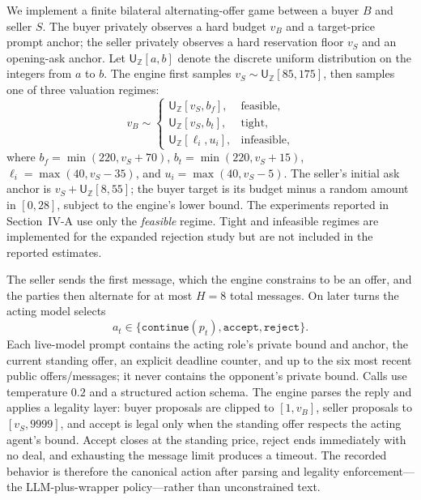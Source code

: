 We implement a finite bilateral alternating-offer game between a buyer $B$ and seller $S$. The buyer privately observes a hard budget $v_B$ and a target-price prompt anchor; the seller privately observes a hard reservation floor $v_S$ and an opening-ask anchor. Let $\mathsf{U}_{\mathbb{Z}}[a,b]$ denote the discrete uniform distribution on the integers from $a$ to $b$. The engine first samples $v_S\sim\mathsf{U}_{\mathbb{Z}}[85,175]$, then samples one of three valuation regimes:
\begin{equation}
v_B\sim
\begin{cases}
\mathsf{U}_{\mathbb{Z}}[v_S,b_f], & \text{feasible},\\
\mathsf{U}_{\mathbb{Z}}[v_S,b_t], & \text{tight},\\
\mathsf{U}_{\mathbb{Z}}[\ell_i,u_i], & \text{infeasible},
\end{cases}
\end{equation}
where $b_f=\min(220,v_S+70)$, $b_t=\min(220,v_S+15)$, $\ell_i=\max(40,v_S-35)$, and $u_i=\max(40,v_S-5)$. The seller's initial ask anchor is $v_S+\mathsf{U}_{\mathbb{Z}}[8,55]$; the buyer target is its budget minus a random amount in $[0,28]$, subject to the engine's lower bound. The experiments reported in Section~IV-A use only the \emph{feasible} regime. Tight and infeasible regimes are implemented for the expanded rejection study but are not included in the reported estimates.

The seller sends the first message, which the engine constrains to be an offer, and the parties then alternate for at most $H=8$ total messages. On later turns the acting model selects
\begin{equation}
a_t\in\{\texttt{continue}(p_t),\texttt{accept},\texttt{reject}\}.
\end{equation}
Each live-model prompt contains the acting role's private bound and anchor, the current standing offer, an explicit deadline counter, and up to the six most recent public offers/messages; it never contains the opponent's private bound. Calls use temperature $0.2$ and a structured action schema. The engine parses the reply and applies a legality layer: buyer proposals are clipped to $[1,v_B]$, seller proposals to $[v_S,9999]$, and accept is legal only when the standing offer respects the acting agent's bound. Accept closes at the standing price, reject ends immediately with no deal, and exhausting the message limit produces a timeout. The recorded behavior is therefore the canonical action after parsing and legality enforcement---the LLM-plus-wrapper policy---rather than unconstrained text.

